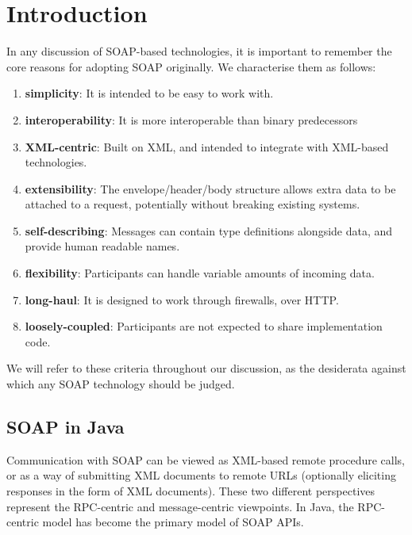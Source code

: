 \section{Introduction}
\label{introduction}

In any discussion of SOAP-based technologies, it is important to
remember the core reasons for adopting SOAP originally. We
characterise them as follows:

\begin{enumerate}
\item \textbf{simplicity}: It is intended to be easy to work with.

\item \textbf{interoperability}: It is more interoperable than binary
predecessors

\item \textbf{XML-centric}: Built on XML, and intended to integrate with
XML-based technologies.

\item \textbf{extensibility}: The envelope/header/body structure allows extra
data to be attached to a request, potentially without breaking existing systems.

\item \textbf{self-describing}: Messages can contain type definitions alongside
data, and provide human readable names.

\item \textbf{flexibility}: Participants can handle variable amounts of incoming
data.

\item \textbf{long-haul}: It is designed to work through firewalls, over HTTP.

\item \textbf{loosely-coupled}: Participants are not expected to share
implementation code.
\end{enumerate}

We will refer to these criteria throughout our discussion, as the
desiderata against which any SOAP technology should be judged.

\subsection{SOAP in Java}
\label{intro:java}

Communication with SOAP can be viewed as XML-based remote procedure calls, or as
a way of submitting XML documents to remote URLs (optionally eliciting responses
in the form of XML documents). These two different perspectives represent the
RPC-centric and message-centric viewpoints. In Java, the RPC-centric model has
become the primary model of SOAP APIs.


